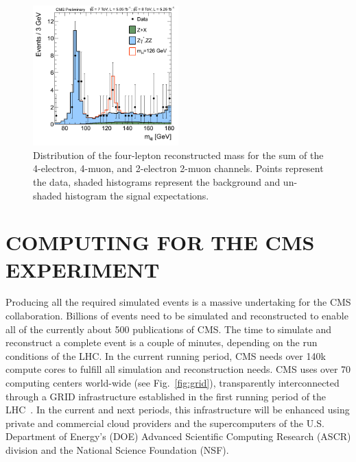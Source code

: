 \documentclass{wscpaperproc}
\theoremstyle{wsc}
\begin{document}
\begin{figure}[htb]
{
   \centering
   \includegraphics[width=0.50\textwidth]{higgs}
   \caption{Distribution of the four-lepton reconstructed mass for the sum of the 4-electron, 4-muon, and 2-electron 2-muon channels. Points represent the data, shaded histograms represent the background and un-shaded histogram the signal expectations.
   \label{fig:higgs}}
}
\end{figure}

\section{COMPUTING FOR THE CMS EXPERIMENT}
\label{sec:computing}

Producing all the required simulated events is a massive undertaking for the CMS collaboration. Billions of events need to be simulated and reconstructed to enable all of the currently about 500 publications of CMS. The time to simulate and reconstruct a complete event is a couple of minutes, depending on the run conditions of the LHC. In the current running period, CMS needs over 140k compute cores to fulfill all simulation and reconstruction needs. CMS uses over 70 computing centers world-wide (see Fig.~\ref{fig:grid}), transparently interconnected through a GRID infrastructure established in the first running period of the LHC~. In the current and next periods, this infrastructure will be enhanced using private and commercial cloud providers and the supercomputers of the U.S. Department of Energy's (DOE) Advanced Scientific Computing Research (ASCR) division and the National Science Foundation (NSF).
\end{document}

